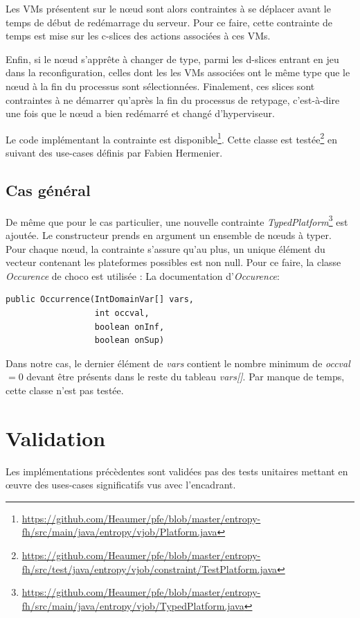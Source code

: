 \documentclass[a4paper]{article}
\begin{document}
Les VMs présentent sur le nœud sont alors contraintes à se déplacer
avant le temps de début de redémarrage du serveur. Pour ce faire,
cette contrainte de temps est mise sur les c-slices des actions
associées à ces VMs.

Enfin, si le nœud s'apprête à changer de type, parmi les
d-slices entrant en jeu dans la reconfiguration, celles dont
les les VMs associées ont le même type que le nœud à la fin du processus
sont sélectionnées. Finalement, ces slices sont contraintes à ne démarrer
qu'après la fin du processus de retypage, c'est-à-dire une fois que
le nœud a bien redémarré et changé d'hyperviseur.

Le code implémentant la contrainte est
disponible\footnote{\url{https://github.com/Heaumer/pfe/blob/master/entropy-fh/src/main/java/entropy/vjob/Platform.java}}. Cette
classe est testée\footnote{\url{https://github.com/Heaumer/pfe/blob/master/entropy-fh/src/test/java/entropy/vjob/constraint/TestPlatform.java}}
en suivant des use-cases définis par Fabien Hermenier.

\subsection{Cas général}
De même que pour le cas particulier, une nouvelle contrainte
\textit{TypedPlatform}\footnote{\url{https://github.com/Heaumer/pfe/blob/master/entropy-fh/src/main/java/entropy/vjob/TypedPlatform.java}}
est ajoutée. Le constructeur prends en argument un ensemble de nœuds
à typer. Pour chaque nœud, la contrainte s'assure qu'au plus, un
unique élément du vecteur contenant les plateformes possibles est non
null. Pour ce faire, la classe \textit{Occurence} de choco est
utilisée : 
La documentation d'\textit{Occurence}:
\begin{verbatim}
public Occurrence(IntDomainVar[] vars,
                  int occval,
                  boolean onInf,
                  boolean onSup)
\end{verbatim}
Dans notre cas, le dernier élément de \textit{vars} contient le nombre
minimum de \textit{occval}$=0$ devant être présents dans le reste du
tableau \textit{vars[]}.
Par manque de temps, cette classe n'est pas testée.

\section{Validation}
Les implémentations précèdentes sont validées pas des tests unitaires mettant
en œuvre des uses-cases significatifs vus avec l'encadrant.
\end{document}
